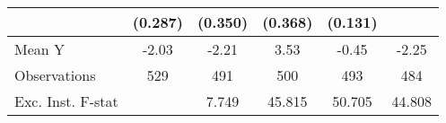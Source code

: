 {\begin{tabular}{l*{5}{c}}
            &     (0.287)         &     (0.350)         &     (0.368)         &     (0.131)         &                     \\
\midrule
Mean Y      &       -2.03         &       -2.21         &        3.53         &       -0.45         &       -2.25         \\
Observations&         529         &         491         &         500         &         493         &         484         \\
Exc. Inst. F-stat&                     &       7.749         &      45.815         &      50.705         &      44.808         \\
\bottomrule
\end{tabular}
}
